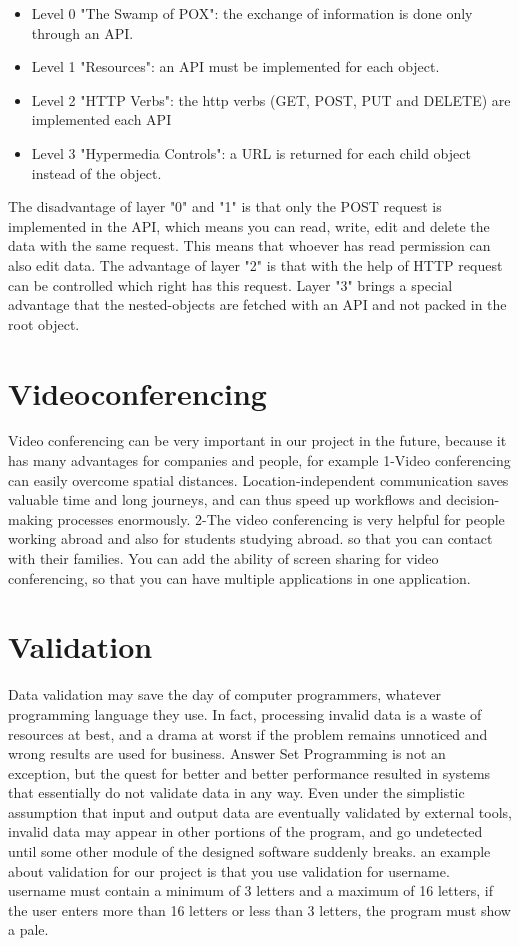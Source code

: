\begin{itemize}
    \item Level 0 "The Swamp of POX": the exchange of information is done only through an API\@.
    \item Level 1 "Resources": an API must be implemented for each object.
    \item Level 2 "HTTP Verbs": the http verbs (GET, POST, PUT and DELETE) are implemented each API
    \item Level 3 "Hypermedia Controls": a URL is returned for each child object instead of the object.
\end{itemize}
\noindent
The disadvantage of layer "0" and "1" is that only the POST request is implemented in the API,
which means you can read, write, edit and delete the data with the same request.
This means that whoever has read permission can also edit data.
The advantage of layer "2" is that with the help of HTTP request can be controlled which right has
this request.
Layer "3" brings a special advantage that the nested-objects are fetched with an API and not packed
in the root object.

\section {Videoconferencing}\label{sec:vidioconferenz}
Video conferencing can be very important in our project in the future, because it has many advantages
for companies and people, for example
1-Video conferencing can easily overcome spatial distances. Location-independent communication
saves valuable time and long journeys, and can thus speed up workflows and decision-making processes
enormously.
2-The video conferencing is very helpful for people working abroad and also for students studying abroad.
so that you can contact with their families.
You can add the ability of screen sharing for video conferencing, so that you can have multiple applications
in one application.


\section{Validation}\label{sec:validation}
Data validation may save the day of computer programmers, whatever programming language they use.
In fact, processing invalid data is a waste of resources at best, and a drama at worst if the problem
remains unnoticed and wrong results are used for business. Answer Set Programming is not an exception,
but the quest for better and better performance resulted in systems that essentially do not validate
data in any way. Even under the simplistic assumption that input and output data are eventually
validated by external tools, invalid data may appear in other portions of the program, and go
undetected until some other module of the designed software suddenly breaks.
an example about validation for our project is
that you use validation for username.
username must contain a minimum of 3 letters and a maximum of 16 letters, if the user enters more
than 16 letters or less than 3 letters, the program must show a pale.



